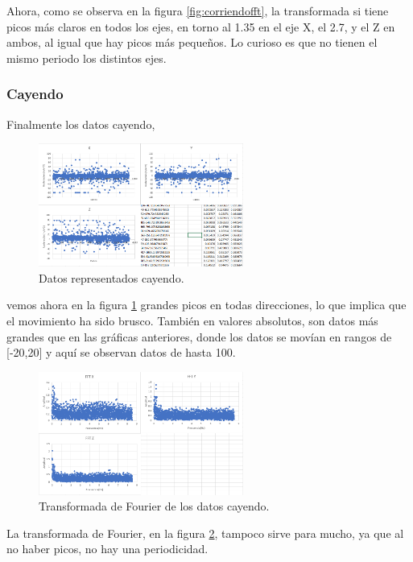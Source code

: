 \documentclass[12pt]{article}
\numberwithin{equation}{section}
\begin{document}
Ahora, como se observa en la figura \ref{fig:corriendofft}, la transformada si tiene picos más claros en todos los ejes, en torno al 1.35 en el eje X, el 2.7, y el Z en ambos, al igual que hay picos más pequeños. Lo curioso es que no tienen el mismo periodo los distintos ejes.

\subsubsection{Cayendo}

Finalmente los datos cayendo,
\begin{figure}[h]
    \centering
    \includegraphics[width=0.6\textwidth]{cayendoraw.png}
    \caption{Datos representados cayendo.}
    \label{fig:cayendoraw}
\end{figure}
vemos ahora en la figura \ref{fig:cayendoraw} grandes picos en todas direcciones, lo que implica que el movimiento ha sido brusco. También en valores absolutos, son datos más grandes que en las gráficas anteriores, donde los datos se movían en rangos de [-20,20] y aquí se observan datos de hasta 100.

\begin{figure}[h]
    \centering
    \includegraphics[width=0.6\textwidth]{cayendofft.png}
    \caption{Transformada de Fourier de los datos cayendo.}
    \label{fig:cayendofft}
\end{figure}

La transformada de Fourier, en la figura \ref{fig:cayendofft}, tampoco sirve para mucho, ya que al no haber picos, no hay una periodicidad.
\end{document}
